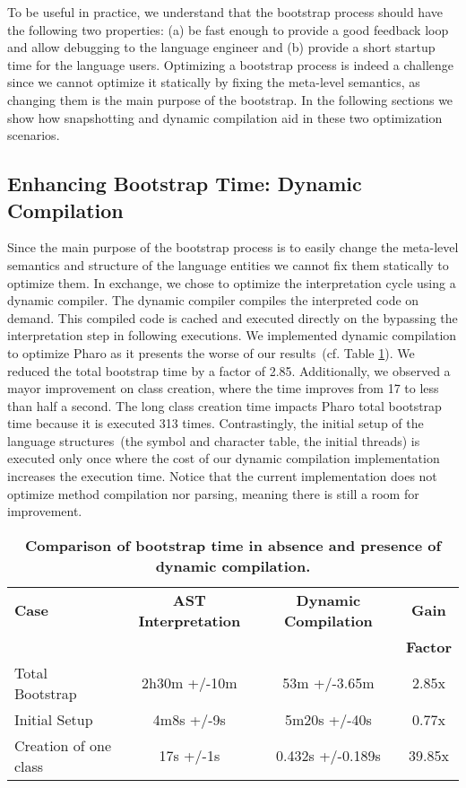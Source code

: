 To be useful in practice, we understand that the bootstrap process should have the following two properties: (a) be fast enough to provide a good feedback loop and allow debugging to the language engineer and (b) provide a short startup time for the language users. Optimizing a bootstrap process is indeed a challenge since we cannot optimize it statically by fixing the meta-level semantics, as changing them is the main purpose of the bootstrap. In the following sections we show how snapshotting and dynamic compilation aid in these two optimization scenarios. 

\subsection*{Enhancing Bootstrap Time: Dynamic Compilation}
Since the main purpose of the bootstrap process is to easily change the meta-level semantics and structure of the language entities we cannot fix them statically to optimize them. In exchange, we chose to optimize the interpretation cycle using a dynamic compiler. The dynamic compiler compiles the interpreted code on demand. This compiled code is cached and executed directly on the \VM bypassing the interpretation step in following executions. We implemented dynamic compilation to optimize Pharo as it presents the worse of our results~(cf. Table \ref{tb:dynamic_compilation}). We reduced the total bootstrap time by a factor of 2.85. Additionally, we observed a mayor improvement on class creation, where the time improves from 17 to less than half a second. The long class creation time impacts Pharo total bootstrap time because it is executed 313 times. Contrastingly, the initial setup of the language structures~(\eg the symbol and character table, the initial threads) is executed only once where the cost of our dynamic compilation implementation increases the execution time. Notice that the current implementation does not optimize method compilation nor parsing, meaning there is still a room for improvement.

 \begin{table}[ht]
 \small
 	\centering
 	\begin{tabular}{lccc}
			\toprule
			\textbf{Case}
 			& \textbf{AST Interpretation}
			& \textbf{Dynamic Compilation}
			& \textbf{Gain}\\
			&&& \textbf{Factor}\\
		\toprule
		Total Bootstrap & 2h30m +/-10m & 53m +/-3.65m & 2.85x\\\midrule
 		Initial Setup& 4m8s +/-9s & 5m20s +/-40s & 0.77x\\\midrule
		Creation of one class & 17s +/-1s & 0.432s +/-0.189s & 39.85x\\\bottomrule
 	\end{tabular}
	\vspace*{0.2cm}
 	\caption{\small\textbf{Comparison of bootstrap time in absence and presence of dynamic compilation.}\label{tb:dynamic_compilation}}
 \end{table}

